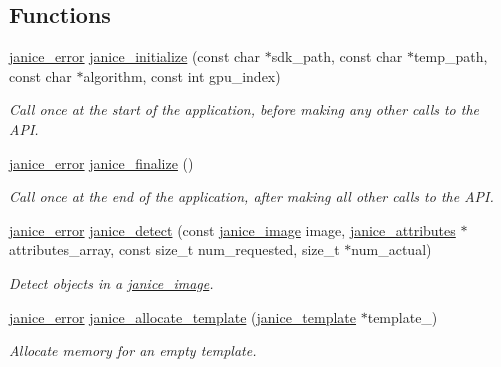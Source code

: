 \subsection*{Functions}
\begin{DoxyCompactItemize}
\item 
\hyperlink{group__janice_ga4873d49c1f9d6a6880dfbd485cf6ba72}{janice\+\_\+error} \hyperlink{group__janice_ga099241a8ed3bab6da3247a15a471fc00}{janice\+\_\+initialize} (const char $\ast$sdk\+\_\+path, const char $\ast$temp\+\_\+path, const char $\ast$algorithm, const int gpu\+\_\+index)
\begin{DoxyCompactList}\small\item\em Call once at the start of the application, before making any other calls to the A\+P\+I. \end{DoxyCompactList}\item 
\hyperlink{group__janice_ga4873d49c1f9d6a6880dfbd485cf6ba72}{janice\+\_\+error} \hyperlink{group__janice_ga3a2f0366f897c1168639b152b2cdf554}{janice\+\_\+finalize} ()
\begin{DoxyCompactList}\small\item\em Call once at the end of the application, after making all other calls to the A\+P\+I. \end{DoxyCompactList}\item 
\hyperlink{group__janice_ga4873d49c1f9d6a6880dfbd485cf6ba72}{janice\+\_\+error} \hyperlink{group__janice_ga689c273a241f8e8694468fa561a7184b}{janice\+\_\+detect} (const \hyperlink{structjanice__image}{janice\+\_\+image} image, \hyperlink{structjanice__attributes}{janice\+\_\+attributes} $\ast$attributes\+\_\+array, const size\+\_\+t num\+\_\+requested, size\+\_\+t $\ast$num\+\_\+actual)
\begin{DoxyCompactList}\small\item\em Detect objects in a \hyperlink{structjanice__image}{janice\+\_\+image}. \end{DoxyCompactList}\item 
\hyperlink{group__janice_ga4873d49c1f9d6a6880dfbd485cf6ba72}{janice\+\_\+error} \hyperlink{group__janice_ga5709bc7f0fd329db20f72cac8639c328}{janice\+\_\+allocate\+\_\+template} (\hyperlink{group__janice_ga5593b06e86b90504968c0fc191ee2f3c}{janice\+\_\+template} $\ast$template\+\_\+)
\begin{DoxyCompactList}\small\item\em Allocate memory for an empty template. \end{DoxyCompactList}\item 

\end{DoxyCompactItemize}

